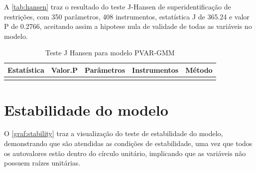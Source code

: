 \documentclass[
  12pt,
  12pt,
  openright,
  oneside,
  a4paper,
  chapter=TITLE,
  section=TITLE,
  subsection=TITLE,
  subsubsection=TITLE,
  portugues,
  sumario=tradicional]{abntex2}
\begin{document}
\vspace{-1mm}

\label{tb:pvargmm}
\vspace{-2mm}
\vspace{20pt}

\parindent 1.50cm

\vspace{20pt}

A \autoref{tab:hansen} traz o resultado do teste J-Hansen de superidentificação de restrições, com 350 parâmetros, 408 instrumentos, estatística J de 365.24 e valor P de 0.2766, aceitando assim a hipotese nula de validade de todas as variáveis no modelo.

\begin{table}[!hbtp]
\caption{Teste J Hansen para modelo PVAR-GMM}
\vspace{-1mm}

\begin{tabu} to 
\toprule
Estatística & Valor.P & Parâmetros & Instrumentos & Método\\
\midrule
{} &  &  &  & \\
\bottomrule
\end{tabu}
\vspace{1mm}
\label{tab:hansen}
\vspace{-2mm}
\end{table}

\section{Estabilidade do modelo}

O \autoref{graf:stability} traz a visualização do teste de estabilidade do modelo, demonstrando que são atendidas as condições de estabilidade, uma vez que todos os autovalores estão dentro do círculo unitário, implicando que as variáveis não possuem raízes unitárias.
\end{document}
